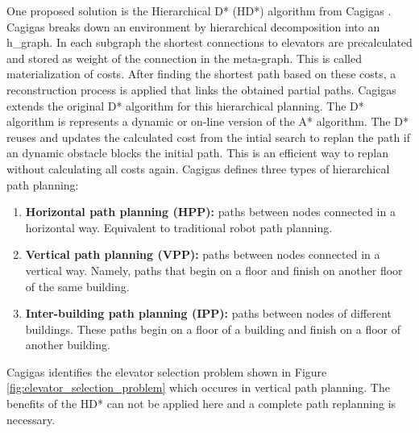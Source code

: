 One proposed solution is the Hierarchical D* (HD*) algorithm from Cagigas \cite{cagigas_hierarchical_2005}. Cagigas breaks down an environment by hierarchical decomposition into an \gls{h_graph}. In each subgraph the shortest connections to elevators are precalculated and stored as weight of the connection in the meta-graph. This is called materialization of costs. After finding the shortest path based on these costs, a reconstruction process is applied that links the obtained partial paths. Cagigas extends the original D* algorithm \cite{hebert_optimal_1997} for this hierarchical planning. The D* algorithm is represents a dynamic or on-line version of the A* algorithm. The D* reuses and updates the calculated cost from the intial search to replan the path if an dynamic obstacle blocks the initial path. This is an efficient way to replan without calculating all costs again. Cagigas defines three types of hierarchical path planning: 
\begin{enumerate}
    \item \textbf{Horizontal path planning (HPP):} paths between nodes connected in a horizontal way. Equivalent to traditional robot path planning.
    \item \textbf{Vertical path planning (VPP):} paths between nodes connected in a vertical way. Namely, paths that begin on a floor and finish on another floor of the same building.
    \item \textbf{Inter-building path planning (IPP):} paths between nodes of different buildings. These paths begin on a floor of a building and finish on a floor of another building.
\end{enumerate}
Cagigas identifies the elevator selection problem shown in Figure \ref{fig:elevator_selection_problem} which occures in vertical path planning. The benefits of the HD* can not be applied here and a complete path replanning is necessary.

